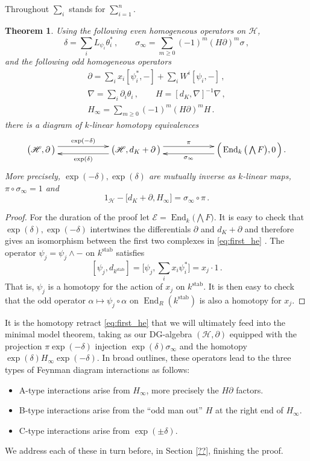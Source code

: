 \documentclass[english,letter paper,12pt,leqno]{article}
\newtheorem{theorem}{Theorem}[section]
\theoremstyle{example}
\numberwithin{equation}{section}
\def\stab{\operatorname{stab}}
\def\be{\begin{equation}}
\def\ee{\end{equation}}
\DeclareMathOperator{\End}{End}
\begin{document}
Throughout $\sum_i$ stands for $\sum_{i=1}^n$.

\begin{theorem}\label{theorem:main_retract} Using the following even homogeneous operators on $\mathscr{H}$,
\be
\delta = \sum_i L_{\psi_i} \theta_i^*\,, \qquad \sigma_\infty = \sum_{m \ge 0} (-1)^m (H \partial)^m \sigma\,,\label{eq:sigmainftyorig}
\ee
and the following odd homogeneous operators
\begin{gather}
\partial = \sum_i x_i [\psi_i^*,-] + \sum_i W^i [\psi_i,-]\,,\\
\nabla = \sum_i \partial_i \theta_i\,, \qquad H = [d_K, \nabla]^{-1} \nabla\,,\label{defn:Horiginal}\\
H_\infty = \sum_{m \ge 0} (-1)^m (H \partial)^m H\,.\label{eq:hinftyorig}
\end{gather}
there is a diagram of $k$-linear homotopy equivalences
\be\label{eq:first_he}
\xymatrix@C+3pc{
\big( \mathscr{H}, \partial \,\big) \ar@<1ex>[r]^-{\exp(-\delta)} & \big( \mathscr{H}, d_K + \partial \,\big) \ar@<1ex>[l]^-{ \exp(\delta) } \ar@<1ex>[r]^-{\pi} & \Big( \End_k\big( \bigwedge F \big), 0 \,\Big)\,.\ar@<1ex>[l]^-{ \sigma_\infty }
}
\ee
More precisely, $\exp(-\delta), \exp(\delta)$ are mutually inverse as $k$-linear maps, $\pi \circ \sigma_\infty = 1$ and
\be
1_{\mathscr{H}} - \big[ d_K + \partial, H_\infty \big] = \sigma_\infty \circ \pi\,.
\ee
\end{theorem}
\begin{proof}
For the duration of the proof let $\mathscr{E} = \End_k\big( \bigwedge F \big)$. It is easy to check that $\exp(\delta),\exp(-\delta)$ intertwines the differentials $\partial$ and $d_K + \partial$ and therefore gives an isomorphism between the first two complexes in \eqref{eq:first_he} \cite[Proposition 4.11]{murfet}. The operator $\psi_j = \psi_j \wedge -$ on $k^{\stab}$ satisfies
\[
[ \psi_j, d_{k^{\stab}} ] = \big[ \psi_j, \sum_i x_i \psi_i^* \big] = x_j \cdot 1\,.
\]
That is, $\psi_j$ is a homotopy for the action of $x_j$ on $k^{\stab}$. It is then easy to check that the odd operator $\alpha \mapsto \psi_j \circ \alpha$ on $\End_R(k^{\stab})$ is also a homotopy for $x_j$.
\end{proof}

It is the homotopy retract \eqref{eq:first_he} that we will ultimately feed into the minimal model theorem, taking as our DG-algebra $(\mathscr{H}, \partial)$ equipped with the projection $\pi \exp(-\delta)$ injection $\exp(\delta) \sigma_\infty$ and the homotopy $\exp(\delta) H_\infty \exp(-\delta)$. In broad outlines, these operators lead to the three types of Feynman diagram interactions as follows:
\begin{itemize}
\item A-type interactions arise from $H_\infty$, more precisely the $H \partial$ factors.
\item B-type interactions arise from the ``odd man out'' $H$ at the right end of $H_\infty$.
\item C-type interactions arise from $\exp(\pm \delta)$.
\end{itemize}
We address each of these in turn before, in Section \ref{??}, finishing the proof.
\end{document}
